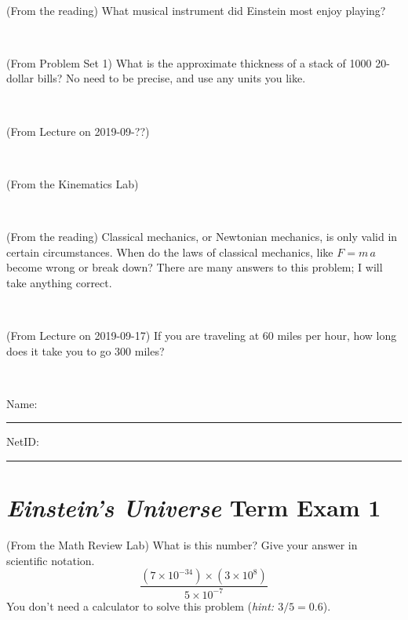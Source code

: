 \documentclass[12pt, letterpaper]{article}
\begin{document}
\vfill ~

\begin{problem} (From the reading)
What musical instrument did Einstein most enjoy playing?
\end{problem}


\vfill ~

\begin{problem} (From Problem Set 1)
What is the approximate thickness of a stack of 1000 20-dollar bills?
No need to be precise, and use any units you like.
\end{problem}


\vfill ~


\clearpage


\begin{problem} (From Lecture on 2019-09-??)
\end{problem}


\vfill ~

\begin{problem} (From the Kinematics Lab)

\end{problem}


\vfill ~

\begin{problem} (From the reading)
Classical mechanics, or Newtonian mechanics, is only valid in certain
circumstances. When do the laws of classical mechanics, like $F =
m\,a$ become wrong or break down? There are many answers to this
problem; I will take anything correct.
\end{problem}


\vfill ~

\begin{problem} (From Lecture on 2019-09-17)
If you are traveling at 60 miles per hour, how long does
it take you to go 300 miles?
\end{problem}


\vfill ~


\cleardoublepage



\noindent
Name: \rule[-1ex]{0.60\textwidth}{0.1pt}
NetID: \rule[-1ex]{0.20\textwidth}{0.1pt}

\section*{\textsl{Einstein's Universe} Term Exam 1}
\setcounter{problem}{1}


\begin{problem} (From the Math Review Lab)
What is this number? Give your answer in scientific notation.
$$
\frac{(7\times10^{-34})\times(3\times10^8)}{5\times10^{-7}}
$$
You don't need a calculator to solve this problem (\textit{hint: $3/5=0.6$}).
\end{problem}
\end{document}
